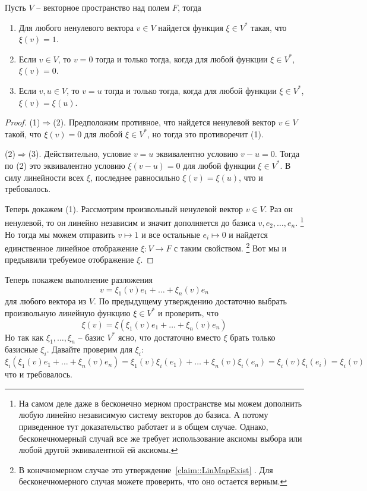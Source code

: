\begin{claim}
\label{claim::VecPointwiseEq}
Пусть $V$ -- векторное пространство над полем $F$, тогда
\begin{enumerate}
\item Для любого ненулевого вектора $v\in V$ найдется функция $\xi \in V^*$ такая, что $\xi (v) = 1$.

\item Если $v\in V$, то $v = 0$ тогда и только тогда, когда для любой функции $\xi \in V^*$, $\xi(v) = 0$.

\item Если $v, u\in V$, то $v = u$ тогда и только тогда, когда для любой функции $\xi \in V^*$, $\xi(v) = \xi(u)$.
\end{enumerate}
\end{claim}
\begin{proof}
(1)$\Rightarrow$(2).
Предположим противное, что найдется ненулевой вектор $v\in V$ такой, что $\xi(v) = 0$ для любой $\xi\in V^*$, но тогда это противоречит (1).

(2)$\Rightarrow$(3).
Действительно, условие $v = u$ эквивалентно условию $v - u = 0$.
Тогда по (2) это эквивалентно условию $\xi(v - u) = 0$ для любой функции $\xi \in V^*$.
В силу линейности всех $\xi$, последнее равносильно
$\xi(v) = \xi(u)$, что и требовалось.

Теперь докажем (1).
Рассмотрим произвольный ненулевой вектор $v\in V$.
Раз он ненулевой, то он линейно независим и значит дополняется до базиса $v, e_2,\ldots, e_n$.%
\footnote{На самом деле даже в бесконечно мерном пространстве мы можем дополнить любую линейно независимую систему векторов до базиса.
А потому приведенное тут доказательство работает и в общем случае.
Однако, бесконечномерный случай все же требует использование аксиомы выбора или любой другой эквивалентной ей аксиомы.}
Но тогда мы можем отправить $v \mapsto 1$ и все остальные $e_i \mapsto 0$ и найдется единственное линейное отображение $\xi \colon V\to F$ с таким свойством.%
\footnote{В конечномерном случае это утверждение~\ref{claim::LinMapExist} .
Для бесконечномерного случая можете проверить, что оно остается верным.}
Вот мы и предъявили требуемое отображение $\xi$.
\end{proof}

Теперь покажем выполнение разложения
\[
v = \xi_1(v) e_1 + \ldots + \xi_n(v) e_n
\]
для любого вектора из $V$.
По предыдущему утверждению достаточно выбрать произвольную линейную функцию $\xi\in V^*$ и проверить, что
\[
\xi(v) = \xi(\xi_1(v) e_1 + \ldots + \xi_n(v) e_n)
\]
Но так как $\xi_1,\ldots,\xi_n$ -- базис $V^*$ ясно, что достаточно вместо $\xi$ брать только базисные $\xi_i$.
Давайте проверим для $\xi_i$:
\[
\xi_i(\xi_1(v) e_1 + \ldots + \xi_n(v) e_n) =\xi_1(v) \xi_i( e_1) + \ldots + \xi_n(v) \xi_i(e_n) = \xi_i(v) \xi_i(e_i) = \xi_i(v)
\]
что и требовалось.


